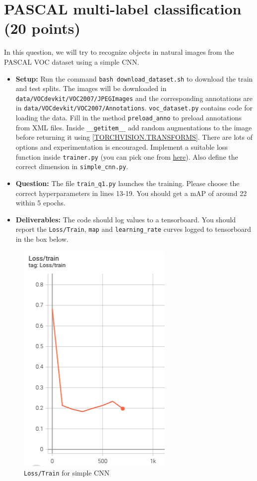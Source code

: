 \documentclass[11pt,addpoints,answers]{exam}
\numberwithin{equation}{section} %
\numberwithin{figure}{section} %
\numberwithin{table}{section} %
\begin{document}
\section{PASCAL multi-label classification (20 points)}
In this question, we will try to recognize objects in natural images from the PASCAL VOC dataset using a simple CNN.
\begin{itemize}
    \item \textbf{Setup:}  Run the command \texttt{bash download\_dataset.sh} to download the train and test splits. The images will be downloaded in 
\texttt{data/VOCdevkit/VOC2007/JPEGImages} and the corresponding annotations are in \texttt{data/VOCdevkit/VOC2007/Annotations}. \texttt{voc\_dataset.py} contains code for loading the data. Fill in the method \texttt{preload\_anno} to preload annotations from XML files. Inside \texttt{\_\_getitem\_\_} add random augmentations to the image before returning it using \href{https://pytorch.org/vision/stable/transforms.html}{[TORCHVISION.TRANSFORMS]}. There are lots of options and experimentation is encouraged. Implement a suitable loss function inside \texttt{trainer.py} (you can pick one from \href{https://pytorch.org/docs/stable/nn.html#loss-functions}{here}). Also define the correct dimension in \texttt{simple\_cnn.py}. 
\item \textbf{Question:} The file \texttt{train\_q1.py} launches the training. Please choose the correct hyperparameters in lines 13-19. You should get a mAP of around 22 within 5 epochs.
\item \textbf{Deliverables:} The code should log values to a tensorboard. You should report the \texttt{Loss/Train}, \texttt{map} and \texttt{learning\_rate} curves logged to tensorboard in the box below.
\end{itemize}

\begin{figure}[H]
    \centering
    \includegraphics[scale=0.8]{./results/q1/loss.png}
    \caption{\texttt{Loss/Train} for simple CNN}
    \label{fig:q1_loss}
\end{figure}
\end{document}
